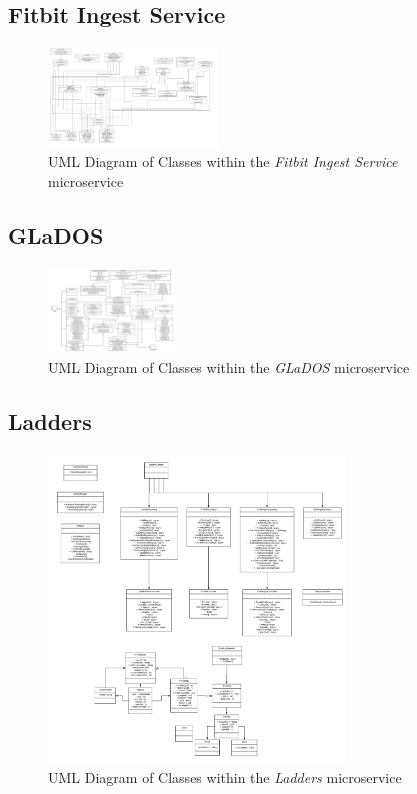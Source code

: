 \subsection{Fitbit Ingest Service}
\begin{figure}[H]
    \centering
    \includegraphics[width=0.4\textwidth]{Images/class_uml/fitbit-ingest-service.png}
    \caption{UML Diagram of Classes within the \textit{Fitbit Ingest Service} microservice}
    \label{fig:class_uml:fitbit-ingest-service}
\end{figure}

\subsection{GLaDOS}
\begin{figure}[H]
    \centering
    \includegraphics[width=0.3\textwidth]{Images/class_uml/glados.png}
    \caption{UML Diagram of Classes within the \textit{GLaDOS} microservice}
    \label{fig:class_uml:glados}
\end{figure}

\subsection{Ladders}
\begin{figure}[H]
    \centering
    \includegraphics[width=0.7\textwidth]{Images/class_uml/ladders.png}
    \caption{UML Diagram of Classes within the \textit{Ladders} microservice}
    \label{fig:class_uml:ladders}
\end{figure}
